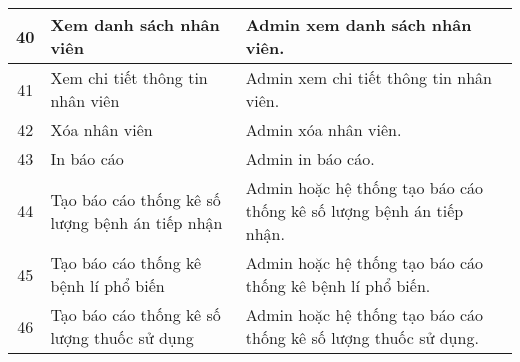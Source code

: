 \begin{longtable}{|c|p{4cm}|p{8cm}|}
    \hline
    40 & Xem danh sách nhân viên & Admin xem danh sách nhân viên. \\
    \hline
    41 & Xem chi tiết thông tin nhân viên & Admin xem chi tiết thông tin nhân viên. \\
    \hline
    42 & Xóa nhân viên & Admin xóa nhân viên. \\
    \hline
    43 & In báo cáo & Admin in báo cáo. \\
    \hline
    44 & Tạo báo cáo thống kê số lượng bệnh án tiếp nhận & Admin hoặc hệ thống tạo báo cáo thống kê số lượng bệnh án tiếp nhận. \\
    \hline
    45 & Tạo báo cáo thống kê bệnh lí phổ biến & Admin hoặc hệ thống tạo báo cáo thống kê bệnh lí phổ biến. \\
    \hline
    46 & Tạo báo cáo thống kê số lượng thuốc sử dụng & Admin hoặc hệ thống tạo báo cáo thống kê số lượng thuốc sử dụng. \\
    \hline
\end{longtable}